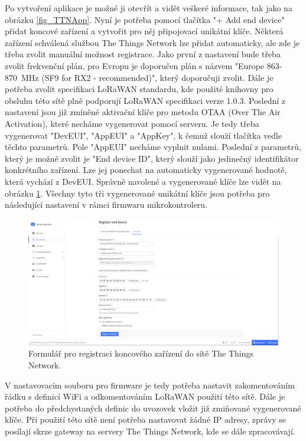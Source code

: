 Po vytvoření aplikace je možné ji otevřít a vidět veškeré informace, tak jako na obrázku \ref{fig_TTNApp}. Nyní je potřeba pomocí tlačítka "+ Add end device"{} přidat koncové zařízení a vytvořit pro něj připojovací unikátní klíče. Některá zařízení schválená službou The Things Network lze přidat automaticky, ale zde je třeba zvolit manuální možnost registrace. Jako první z nastavení bude třeba zvolit frekvenční plán, pro Evropu je doporučen plán s názvem "Europe 863-870~MHz (SF9 for RX2 - recommended)", který doporučuji zvolit. Dále je potřeba zvolit specifikaci LoRaWAN standardu, kde použité knihovny pro obsluhu této sítě plně podporují LoRaWAN specifikaci verze 1.0.3. Poslední z nastavení jsou již zmíněné aktivační klíče pro metodu OTAA (Over The Air Activation), které necháme vygenerovat pomocí serveru. Je tedy třeba vygenerovat "DevEUI", "AppEUI"{} a "AppKey", k čemuž slouží tlačítka vedle těchto parametrů. Pole "AppEUI"{} necháme vyplnit nulami. Poslední z parametrů, který je možné zvolit je "End device ID", který slouží jako jedinečný identifikátor konkrétního zařízení. Lze jej ponechat na automaticky vygenerované hodnotě, která vychází z DevEUI. Správně navolené a vygenerované klíče lze vidět na obrázku \ref{fig_TTNDeviceGeneration}. Všechny tyto tři vygenerované unikátní klíče jsou potřeba pro následující nastavení v rámci firmwaru mikrokontroleru.

\begin{figure}[h]
    \centering
    \includegraphics[width=\textwidth]{obrazky/ttnDeviceRegister.png}
    \caption{Formulář pro registraci koncového zařízení do sítě The Things Network.}
    \label{fig_TTNDeviceGeneration}
\end{figure}

V nastavovacím souboru pro firmware je tedy potřeba nastavit zakomentováním řádku s definicí WiFi a odkomentováním LoRaWAN použití této sítě. Dále je potřeba do předchystaných definic do uvozovek vložit již zmiňované vygenerované klíče. Při použití této sítě není potřeba nastavovat žádné IP adresy, zprávy se posílají skrze gateway na servery The Things Network, kde se dále zpracovávají.


